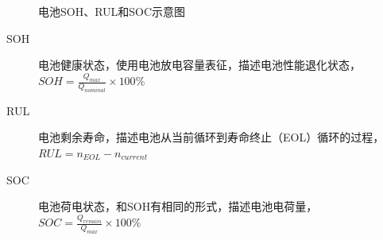 \documentclass{beamer}
\newcommand{\pdfnote}[1]{\marginnote{\pdfcomment[icon=note]{#1}}}
\begin{document}
\begin{frame}
	\begin{figure}[htbp]
		\centering
		\captionsetup{font=tiny}
		\caption{电池SOH、RUL和SOC示意图}
	\end{figure}
	\begin{description}
		\item[SOH]
			电池健康状态，使用电池放电容量表征，描述电池性能退化状态，$SOH = \frac{Q_{max}}{Q_{nominal}} \times 100\%$
		\item[RUL]
			电池剩余寿命，描述电池从当前循环到寿命终止（EOL）循环的过程，$RUL = n_{EOL} - n_{current}$
		\item[SOC]
			电池荷电状态，和SOH有相同的形式，描述电池电荷量，$SOC = \frac{Q_{remain}}{Q_{max}} \times 100\%$
	\end{description}
\end{frame}
\end{document}
